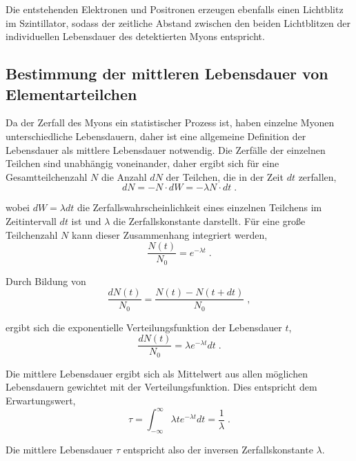 Die entstehenden Elektronen und Positronen erzeugen ebenfalls einen Lichtblitz im Szintillator, sodass der zeitliche Abstand zwischen den beiden Lichtblitzen der individuellen Lebensdauer des detektierten Myons entspricht.

\subsection{Bestimmung der mittleren Lebensdauer von Elementarteilchen}

Da der Zerfall des Myons ein statistischer Prozess ist, haben einzelne Myonen unterschiedliche Lebensdauern, daher ist eine allgemeine Definition der Lebensdauer als mittlere Lebensdauer notwendig. Die Zerfälle der einzelnen Teilchen sind unabhängig voneinander, daher ergibt sich für eine Gesamtteilchenzahl $N$ die Anzahl $dN$ der Teilchen, die in der Zeit $dt$ zerfallen, $$dN = -N \cdot dW = -\lambda N \cdot dt\; . $$

wobei $dW = \lambda dt$ die Zerfallswahrscheinlichkeit eines einzelnen Teilchens im Zeitintervall $dt$ ist und $\lambda$ die Zerfallskonstante darstellt. Für eine große Teilchenzahl $N$ kann dieser Zusammenhang integriert werden, $$\frac{N(t)}{N_0} = e^{-\lambda t}\; . $$

Durch Bildung von $$\frac{dN(t)}{N_0} = \frac{N(t) - N(t+dt)}{N_0}\;  ,  $$

ergibt sich die exponentielle Verteilungsfunktion der Lebensdauer $t$, $$\frac{dN(t)}{N_0} = \lambda e^{-\lambda t} dt\; .$$

Die mittlere Lebensdauer ergibt sich als Mittelwert aus allen möglichen Lebensdauern gewichtet mit der Verteilungsfunktion. Dies entspricht dem Erwartungswert, $$\tau = \int_{-\infty}^{\infty} \lambda t e^{-\lambda t} dt = \frac{1}{\lambda}\; . $$

Die mittlere Lebensdauer $\tau$ entspricht also der inversen Zerfallskonstante $\lambda$.
